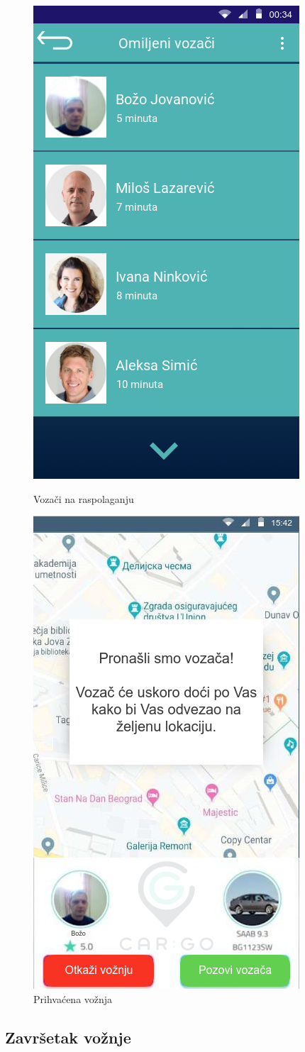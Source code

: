 \begin{figure}[H]
\centering
\begin{minipage}{.5\textwidth}
  \centering
  \includegraphics[width=.4\linewidth]{Slike/vozaci_na_raspolaganju.png}
  \caption{Vozači na raspolaganju}
  \label{fig:Vozaci na raspolaganju}
\end{minipage}%
\begin{minipage}{.5\textwidth}
  \centering
  \includegraphics[width=.4\linewidth]{Slike/Prihvacena_voznja.png}
   \caption{Prihvaćena vožnja}
   \label{fig:Prihvacena voznja}
\end{minipage}
\end{figure}


\subsection{\bfseries Završetak vožnje}

